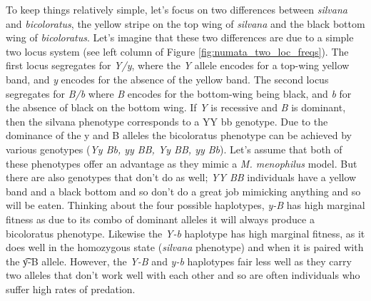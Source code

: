 To keep things relatively simple, let's focus on two differences between  {\it silvana} and {\it  bicoloratus}, the yellow stripe on the top wing of {\it silvana} and the black bottom wing of  {\it  bicoloratus}. Let's imagine that these two differences are due to a simple two locus system (see left column of Figure \ref{fig:numata_two_loc_freqs}). The first locus segregates for {\it Y/y}, where the {\it Y} allele encodes for a top-wing yellow band, and {\it y} encodes for the absence of the yellow band. The second locus segregates for {\it B/b} where {\it B} encodes for the bottom-wing being black, and {\it b} for the absence of black on the bottom wing. If {\it Y} is recessive and {\it B} is dominant, then the silvana phenotype corresponds to a YY bb genotype. Due to the dominance of the y and B alleles the bicoloratus phenotype can be achieved by various genotypes ({\it Yy Bb, yy BB, Yy BB, yy Bb}).  Let's assume that both of these phenotypes offer an advantage as they mimic a {\it M. menophilus} model. But there are also genotypes that don't do as well; {\it YY BB} individuals have a yellow band and a black bottom and so don't do a great job mimicking anything and so will be eaten. Thinking about the  four possible haplotypes, {\it y-B } has high marginal fitness as due to its combo of dominant alleles it will always produce a bicoloratus phenotype. Likewise the {\it Y-b} haplotype has high marginal fitness, as it does well in the homozygous state ({\it silvana} phenotype) and when it is paired with the {\t y-B} allele. However, the {\it Y-B} and {\it y-b} haplotypes fair less well as they carry two alleles that don't work well with each other and so are often individuals who suffer high rates of predation. 

